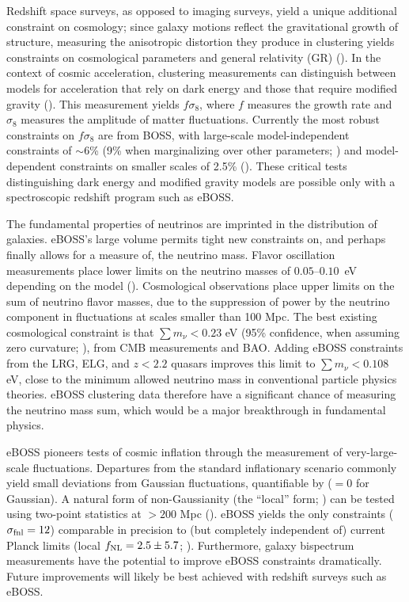 Redshift space surveys, as opposed to imaging surveys, yield a unique
additional constraint on cosmology; since galaxy motions reflect the
gravitational growth of structure, measuring the anisotropic
distortion they produce in clustering yields constraints on cosmological
parameters and general relativity (GR) (\citealt{weinberg13a}). In the
context of cosmic acceleration, clustering measurements can
distinguish between models for acceleration that rely on dark energy
and those that require modified gravity (\citealt{huterer15a}).  This
measurement yields $f\sigma_8$, where $f$ measures the growth rate and
$\sigma_8$ measures the amplitude of matter fluctuations. Currently
the most robust constraints on $f\sigma_8$ are from BOSS, with
large-scale model-independent constraints of $\sim 6$\% (9\% when
marginalizing over other parameters;
\citealt{beutler14a, samushia14a, alam15a}) and model-dependent
constraints on smaller scales of 2.5\% (\citealt{reid14a}). These
critical tests distinguishing dark energy and modified gravity models
are possible only with a spectroscopic redshift program such as eBOSS.

The fundamental properties of neutrinos are imprinted in the
distribution of galaxies. eBOSS's large volume permits tight new
constraints on, and perhaps finally allows for a measure of, the
neutrino mass.  Flavor oscillation measurements place lower limits on
the neutrino masses of $0.05$--$0.10$~eV depending on the model
(\citealt{fogli12a}).  Cosmological observations place upper limits on
the sum of neutrino flavor masses, due to the suppression of power by the
neutrino component in fluctuations at scales smaller than 100 Mpc. The
best existing cosmological constraint is that $\sum m_\nu < 0.23$ eV
(95\% confidence, when assuming zero curvature; \citealt{planckXVI14}),
from CMB measurements and BAO.  Adding eBOSS constraints from the LRG,
ELG, and $z<2.2$ quasars improves this limit to $\sum m_{\nu}
<0.108$ eV, close to the minimum allowed neutrino mass in conventional
particle physics theories.  eBOSS clustering data therefore have a
significant chance of measuring the neutrino mass sum, which would be
a major breakthrough in fundamental physics.

eBOSS pioneers tests of cosmic inflation through the measurement of
very-large-scale fluctuations.  Departures from the standard
inflationary scenario commonly yield small deviations from Gaussian
fluctuations, quantifiable by \fnl ($=0$ for Gaussian). A natural form
of non-Gaussianity (the ``local'' form; \citealt{wands10a}) can be
tested using two-point statistics at $>200$ Mpc
(\citealt{dalal08a}). eBOSS yields the only constraints ($\sigma_{\rm
fnl}=12$) comparable in precision to (but completely independent of)
current Planck limits (local
$f_{\rm NL}=2.5\pm5.7$; \citealt{ade16a}). Furthermore, galaxy bispectrum
measurements have the potential to improve eBOSS constraints
dramatically.  Future improvements will likely be best achieved with
redshift surveys such as eBOSS.


